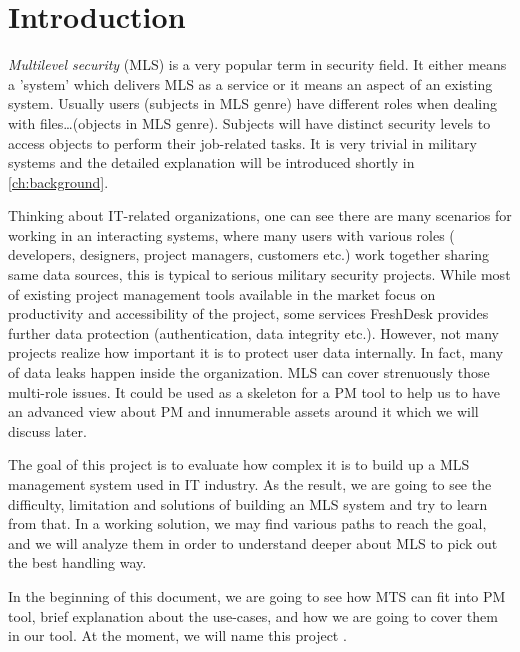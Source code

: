 
\chapter{Introduction} %

\label{ch:introduction} %


\emph{Multilevel security} (MLS) is a very popular term in security field. 
It either means a 'system' which delivers MLS as a service or it means an aspect of an existing system. 
Usually users (subjects in MLS genre) have different roles when dealing with files\dots (objects in MLS genre).
Subjects will have distinct security levels to access objects to perform their job-related tasks.
It is very trivial in military systems and the detailed explanation will be introduced shortly in \autoref{ch:background}.

Thinking about IT-related organizations, one can see there are many scenarios for working in an interacting systems, where many users with various roles (\eg\,developers, designers, project managers, customers etc.) work together sharing same data sources, this is typical \eg to serious military security projects.
While most of existing project management tools available in the market focus on productivity and accessibility of the project, some services \eg FreshDesk provides further data protection (authentication, data integrity etc.). However, not many projects realize how important it is to protect user data internally. In fact, many of data leaks happen inside the organization. MLS can cover strenuously those multi-role issues. It could be used as a skeleton for a PM tool to help us to have an advanced view about PM and innumerable assets around it which we will discuss later.

The goal of this project is to evaluate how complex it is to build up a MLS management system used in IT industry.
As the result, we are going to see the difficulty, limitation and solutions of building an MLS system and try to learn from that.
In a working solution, we may find various paths to reach the goal, and we will analyze them in order to understand deeper about MLS to pick out the best handling way.

In the beginning of this document, we are going to see how MTS can fit into PM tool, brief explanation about the use-cases, and how we are going to cover them in our tool.
At the moment, we will name this project \myProject.

